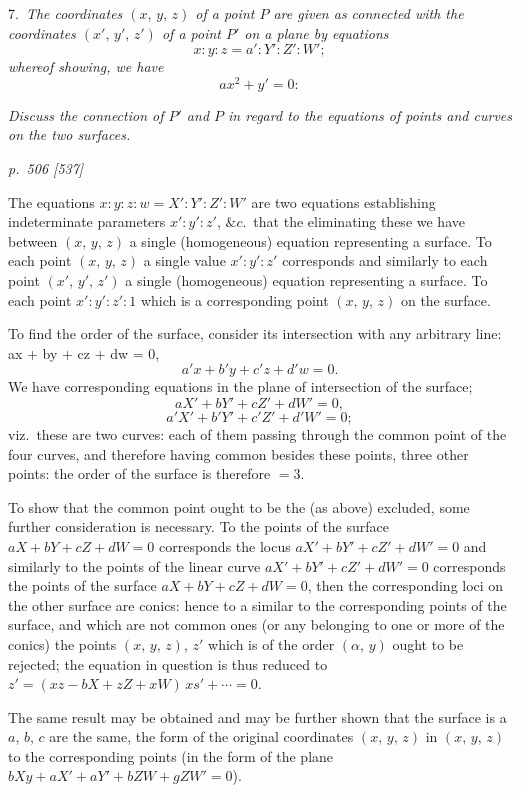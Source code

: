 \documentclass[11pt,a4paper]{book}
\begin{document}
\smallskip
\noindent\textsc{7.}\, \textit{The coordinates $(x,\, y,\, z)$ of a point $P$ are given as connected with the
coordinates $(x',\, y',\, z')$ of a point $P'$ on a plane by equations}
\[
x : y : z = a' : Y' : Z' : W';
\]
\textit{whereof showing, we have}
\[
ax^2 + y' = 0:
\]

\textit{Discuss the connection of $P'$ and $P$ in regard to the equations of points and curves
on the two surfaces.}

\clearpage

\bigskip
\textit{p.~506 [537]}
\smallskip

The equations $x : y : z : w = X' : Y' : Z' : W'$ are two equations establishing
indeterminate parameters $x' : y' : z'$, $\&c.$\, that the eliminating these we have between
$(x,\, y,\, z)$ a single (homogeneous) equation representing a surface. To each point
$(x,\, y,\, z)$ a single value $x' : y' : z'$ corresponds and similarly to each point
$(x',\, y',\, z')$ a single (homogeneous) equation representing a surface. To each point
$x' : y' : z' : 1$ which is a corresponding point $(x,\, y,\, z)$ on the surface.

To find the order of the surface, consider its intersection with any arbitrary line:
ax + by + cz + dw = 0,
\[
a'x + b'y + c'z + d'w = 0.
\]
We have corresponding equations in the plane of intersection of the surface;
\[
aX' + bY' + cZ' + dW' = 0,
\]
\[
a'X' + b'Y' + c'Z' + d'W' = 0;
\]
viz.\ these are two curves: each of them passing through the common point of the four
curves, and therefore having common besides these points, three other points: the
order of the surface is therefore $= 3$.

To show that the common point ought to be the (as above) excluded, some further
consideration is necessary. To the points of the surface $aX + bY + cZ + dW = 0$
corresponds the locus $aX' + bY' + cZ' + dW' = 0$ and similarly to the points of the
linear curve $aX' + bY' + cZ' + dW' = 0$ corresponds the points of the surface
$aX + bY + cZ + dW = 0$, then the corresponding loci on the other surface are conics:
hence to a similar to the corresponding points of the surface, and which are not
common ones (or any belonging to one or more of the conics) the points $(x,\, y,\, z)$,
$z'$ which is of the order $(\alpha,\, y)$ ought to be rejected; the equation in question is thus reduced to
$z' = (xz - bX + zZ + xW)\,xs' + \cdots = 0$.

The same result may be obtained and may be further shown that the surface
is a $a$, $b$, $c$ are the same, the form of the original coordinates $(x,\, y,\, z)$ in
$(x,\, y,\, z)$ to the corresponding points (in the form of the plane $b X y + a X' + a Y' + b Z W + g Z W' = 0$).
\end{document}

